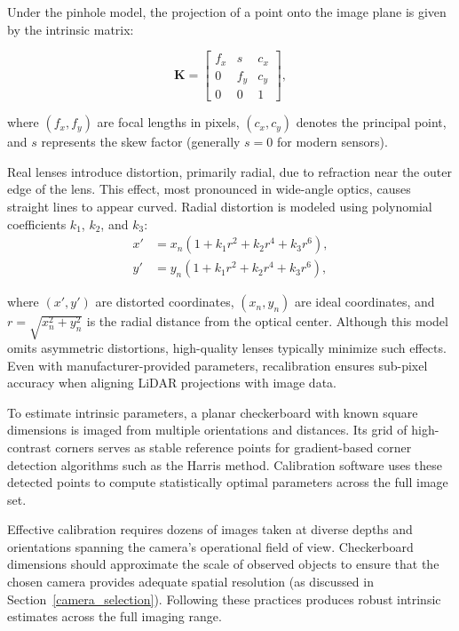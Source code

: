 \documentclass{erauthesis}
\begin{document}
Under the pinhole model, the projection of a point onto the image plane is given by the intrinsic matrix:

\begin{equation}
    \mathbf{K} = 
    \begin{bmatrix}
        f_x & s & c_x \\
        0 & f_y & c_y \\
        0 & 0 & 1
    \end{bmatrix},
\end{equation}

where $(f_x, f_y)$ are focal lengths in pixels, $(c_x, c_y)$ denotes the principal point, and $s$ represents the skew factor (generally $s=0$ for modern sensors).

Real lenses introduce distortion, primarily radial, due to refraction near the outer edge of the lens.  
This effect, most pronounced in wide-angle optics, causes straight lines to appear curved.  
Radial distortion is modeled using polynomial coefficients $k_1$, $k_2$, and $k_3$:
\begin{equation}
    \begin{split}
        x' &= x_n(1 + k_1 r^2 + k_2 r^4 + k_3 r^6), \\
        y' &= y_n(1 + k_1 r^2 + k_2 r^4 + k_3 r^6),
    \end{split}
\end{equation}

where $(x', y')$ are distorted coordinates, $(x_n, y_n)$ are ideal coordinates, and $r = \sqrt{x_n^2 + y_n^2}$ is the radial distance from the optical center.  
Although this model omits asymmetric distortions, high-quality lenses typically minimize such effects.  
Even with manufacturer-provided parameters, recalibration ensures sub-pixel accuracy when aligning \ac{LiDAR} projections with image data.

To estimate intrinsic parameters, a planar checkerboard with known square dimensions is imaged from multiple orientations and distances.  
Its grid of high-contrast corners serves as stable reference points for gradient-based corner detection algorithms such as the Harris method.  
Calibration software uses these detected points to compute statistically optimal parameters across the full image set.

Effective calibration requires dozens of images taken at diverse depths and orientations spanning the camera’s operational field of view.  
Checkerboard dimensions should approximate the scale of observed objects to ensure that the chosen camera provides adequate spatial resolution (as discussed in Section~\ref{camera_selection}).  
Following these practices produces robust intrinsic estimates across the full imaging range.
\end{document}
